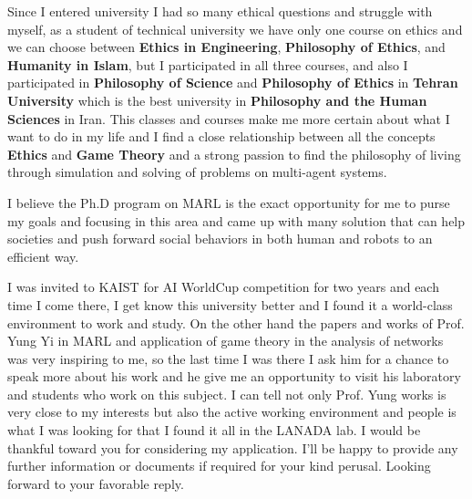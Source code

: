 \documentclass[11pt, a4paper]{awesome-cv}
\begin{document}
\begin{cvletter}
Since I entered university I had so many ethical questions and struggle with myself, as a student of technical university we have only one course on ethics and we can choose between \textbf{Ethics in Engineering}, \textbf{Philosophy of Ethics}, and \textbf{Humanity in Islam}, but I participated in all three courses, and also I participated in \textbf{Philosophy of Science} and \textbf{Philosophy of Ethics} in \textbf{Tehran University} which is the best university in \textbf{Philosophy and the Human Sciences} in Iran. This classes and courses make me more certain about what I want to do in my life and I find a close relationship between all the concepts \textbf{Ethics} and \textbf{Game Theory} and a strong passion to find the philosophy of living through simulation and solving of problems on multi-agent systems.

I believe the Ph.D program on MARL is the exact opportunity for me to purse my goals and focusing in this area and came up with many solution that can help societies and push forward social behaviors in both human and robots to an efficient way.

I was invited to KAIST for AI WorldCup competition for two years and each time I come there, I get know this university better and I found it a world-class environment to work and study. On the other hand the papers and works of Prof. Yung Yi in MARL and application of game theory in the analysis of networks was very inspiring to me, so the last time I was there I ask him for a chance to speak more about his work and he give me an opportunity to visit his laboratory and students who work on this subject.
I can tell not only Prof. Yung works is very close to my interests but also the active working environment and people is what I was looking for that I found it all in the LANADA lab.
\newline
\newline
\newline
\newline
I would be thankful toward you for considering my application. I’ll be happy to provide any further information or documents if required for your kind perusal.
Looking forward to your favorable reply.
\end{cvletter}

\makeletterclosing
\end{document}
